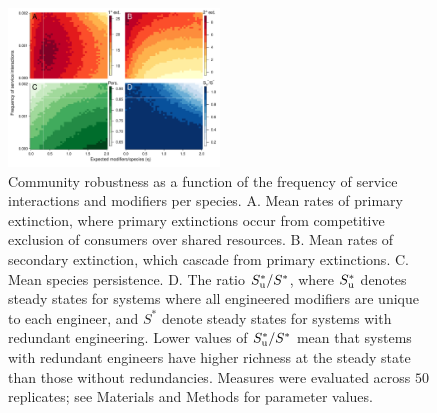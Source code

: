 \documentclass[9pt,twocolumn,twoside]{pnas-new}
\begin{document}
\vspace{-4mm}
\begin{figure}[h!]
\centering
\includegraphics[width=0.5\textwidth]{fig_engineers4.pdf}
\vspace{-8mm}
\caption{
Community robustness as a function of the frequency of service interactions and modifiers per species.
A. Mean rates of primary extinction, where primary extinctions occur from competitive exclusion of consumers over shared resources.
B. Mean rates of secondary extinction, which cascade from primary extinctions.
C. Mean species persistence.
D. The ratio $S^*_{\rm u}/S^*$, where $S^*_{\rm u}$ denotes steady states for systems where all engineered modifiers are unique to each engineer, and $S^*$ denote steady states for systems with redundant engineering. Lower values of $S^*_{\rm u}/S^*$ mean that systems with redundant engineers have higher richness at the steady state than those without redundancies.
Measures were evaluated across $50$ replicates; see Materials and Methods for parameter values.
\vspace{-5mm}
}
\label{fig:engineers}
\end{figure}
\end{document}
